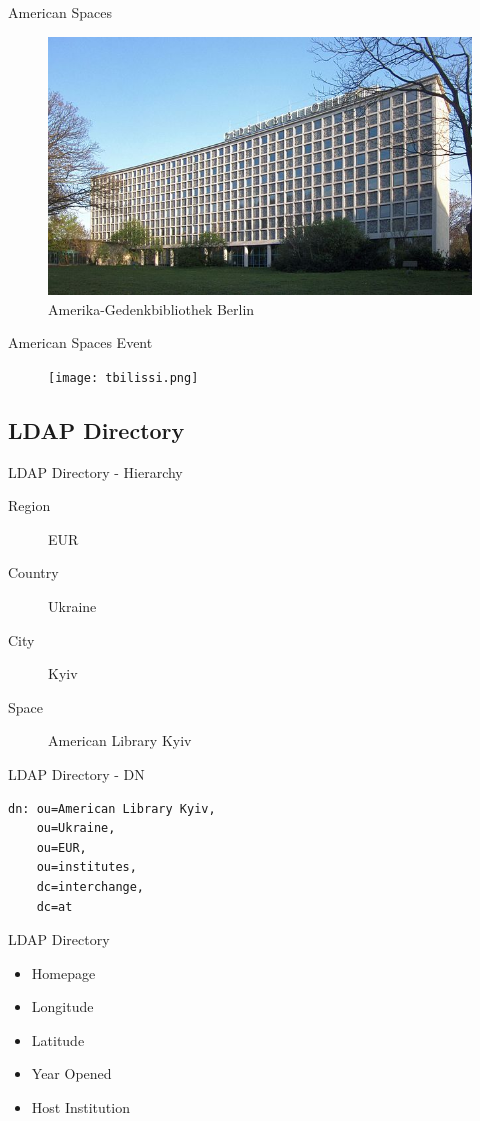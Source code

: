 \begin{frame}{American Spaces}
\begin{figure}
\includegraphics{Amerika-Gedenk-Bibliothek.jpg}
\caption{Amerika-Gedenkbibliothek Berlin}
\end{figure}
\end{frame}

\begin{frame}{American Spaces Event}
\begin{figure}
\texttt{[image: tbilissi.png]}
\end{figure}
\end{frame}

\subsection{LDAP Directory}
\begin{frame}[fragile]{LDAP Directory - Hierarchy}
\begin{description}
\item[Region] EUR
\item[Country] Ukraine
\item[City] Kyiv
\item[Space] American Library Kyiv
\end{description}
\end{frame}

\begin{frame}[fragile]{LDAP Directory - DN}
\begin{lstlisting}
dn: ou=American Library Kyiv,
    ou=Ukraine,
    ou=EUR,
    ou=institutes,
    dc=interchange,
    dc=at
\end{lstlisting}
\end{frame}

\begin{frame}{LDAP Directory}
\begin{itemize}
\item Homepage
\item Longitude
\item Latitude 
\item Year Opened
\item Host Institution 
\end{itemize}
\end{frame}

